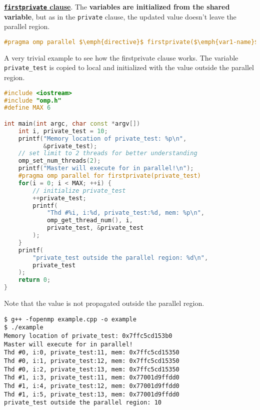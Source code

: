 \noindent
\textbf{\underline{\texttt{firstprivate} clause}}. The \textbf{variables are initialized from the shared variable}, but as in the \texttt{private} clause, the updated value doesn't leave the parallel region.
\begin{openmpbox}
    \begin{lstlisting}[language=C++, mathescape=true]
#pragma omp parallel $\emph{directive}$ firstprivate($\emph{var1-name}$, ...)\end{lstlisting}
\end{openmpbox}
\begin{examplebox}
    A very trivial example to see how the firstprivate clause works. The variable \texttt{private\_test} is copied to local and initialized with the value outside the parallel region.
    \begin{lstlisting}[language=C++]
#include <iostream>
#include "omp.h"
#define MAX 6

int main(int argc, char const *argv[])
    int i, private_test = 10;
    printf("Memory location of private_test: %p\n",
           &private_test);
    // set limit to 2 threads for better understanding
    omp_set_num_threads(2);
    printf("Master will execute for in parallel!\n");
    #pragma omp parallel for firstprivate(private_test)
    for(i = 0; i < MAX; ++i) {
        // initialize private_test
        ++private_test;
        printf(
            "Thd #%i, i:%d, private_test:%d, mem: %p\n", 
            omp_get_thread_num(), i,
            private_test, &private_test
        );
    }
    printf(
        "private_test outside the parallel region: %d\n", 
        private_test
    );
    return 0;
}\end{lstlisting}
    Note that the value is not propagated outside the parallel region.
    \begin{lstlisting}[mathescape=false]
$ g++ -fopenmp example.cpp -o example
$ ./example
Memory location of private_test: 0x7ffc5cd153b0
Master will execute for in parallel!
Thd #0, i:0, private_test:11, mem: 0x7ffc5cd15350
Thd #0, i:1, private_test:12, mem: 0x7ffc5cd15350
Thd #0, i:2, private_test:13, mem: 0x7ffc5cd15350
Thd #1, i:3, private_test:11, mem: 0x77001d9ffdd0
Thd #1, i:4, private_test:12, mem: 0x77001d9ffdd0
Thd #1, i:5, private_test:13, mem: 0x77001d9ffdd0
private_test outside the parallel region: 10\end{lstlisting}
\end{examplebox}

\newpage

